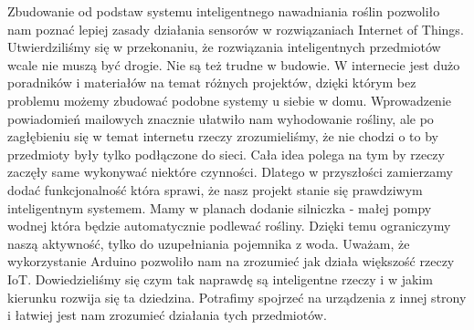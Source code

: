 \documentclass[brudnopis]{xmgr}
\begin{document}
	Zbudowanie od podstaw systemu inteligentnego nawadniania roślin pozwoliło nam poznać lepiej zasady działania sensorów w rozwiązaniach Internet of Things. Utwierdziliśmy się w przekonaniu, że rozwiązania inteligentnych przedmiotów wcale nie muszą być drogie. Nie są też trudne w budowie. W internecie jest dużo poradników i materiałów na temat różnych projektów, dzięki którym bez problemu możemy zbudować podobne systemy u siebie w domu. 
	Wprowadzenie powiadomień mailowych znacznie ułatwiło nam wyhodowanie rośliny, ale po zagłębieniu się w temat internetu rzeczy zrozumieliśmy, że nie chodzi o to by przedmioty były tylko podłączone do sieci. Cała idea polega na tym by rzeczy zaczęły same wykonywać niektóre czynności. Dlatego w przyszłości zamierzamy dodać funkcjonalność która sprawi, że nasz projekt stanie się prawdziwym inteligentnym systemem. Mamy w planach dodanie silniczka - małej pompy wodnej która będzie automatycznie podlewać rośliny. Dzięki temu ograniczymy naszą aktywność, tylko do uzupełniania pojemnika z woda. 
	Uważam, że wykorzystanie Arduino pozwoliło nam na zrozumieć jak działa większość rzeczy IoT. Dowiedzieliśmy się czym tak naprawdę są inteligentne rzeczy i w jakim kierunku rozwija się ta dziedzina. Potrafimy spojrzeć na urządzenia z innej strony i łatwiej jest nam zrozumieć działania tych przedmiotów.

\appendix





\listoffigures

\oswiadczenie
\end{document}
